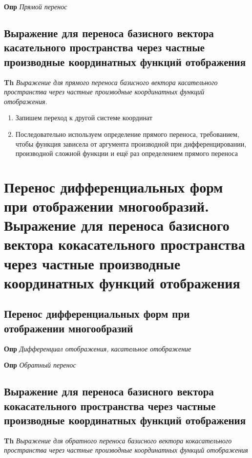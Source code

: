 \documentclass[a4paper, 14pt]{article}
\begin{document}
    \textbf{Опр} \textit{Прямой перенос}
    
    \subsection{Выражение для переноса базисного вектора касательного пространства через частные производные
    координатных функций отображения}
    
    \textbf{Th} \textit{Выражение для прямого переноса базисного вектора касательного пространства через частные
    производные координатных функций отображения.}
    
    \begin{enumerate}
        \item Запишем переход к другой системе координат
        \item Последовательно используем определение прямого переноса, требованием, чтобы функция зависела от
        аргумента производной при дифференцировании, производной сложной функции и ещё раз определением прямого переноса
    \end{enumerate}
    
    \section{Перенос дифференциальных форм при отображении многообразий.
    Выражение для переноса базисного вектора кокасательного пространства через частные производные координатных
    функций отображения}
    
    \subsection{Перенос дифференциальных форм при отображении многообразий}
    
    \textbf{Опр} \textit{Дифференциал отображения, касательное отображение}
    
    \textbf{Опр} \textit{Обратный перенос}
    
    \subsection{Выражение для переноса базисного вектора кокасательного пространства через частные производные координатных
    функций отображения}
    
    \textbf{Th} \textit{Выражение для обратного переноса базисного вектора кокасательного пространства через частные
    производные координатных функций отображения}
    
\end{document}
